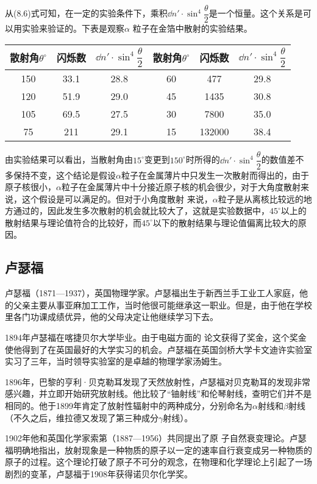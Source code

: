 从(8.6)式可知，在一定的实验条件下，乘积$\dd n'\cdot \sin^4\dfrac{\theta}{2}$是一个恒量。这个关系是可以用实验来验证的。下表是观察$\alpha$
粒子在金箔中散射的实验结果。

\begin{center}
\begin{tabular}{ccc||ccc}
    \hline
    散射角$\theta^{\circ}$  & 闪烁数  &  $\dd n'\cdot \sin^4\dfrac{\theta}{2}$ & 散射角$\theta^{\circ}$  & 闪烁数  &  $\dd n'\cdot \sin^4\dfrac{\theta}{2}$\\
    \hline
    150&    33.1&    28.8&    60&    477&    29.8\\
    120&51.9&29.0&45&1435&30.8\\
    105&69.5&27.5&30&7800&35.0\\
75&211&29.1&15&132000&38.4\\
\hline
\end{tabular}
\end{center}


由实验结果可以看出，当散射角由$15^{\circ}$变更到$150^{\circ}$时所得的$\dd n'\cdot \sin^4\dfrac{\theta}{2}$的数值差不多保持不变，这个结论是假设$\alpha$粒子在金属薄片中只发生一次散射而得出的，由于原子核很小，$\alpha$粒子在金属薄片中十分接近原子核的机会很少，对于大角度散射来说，这个假设是可以满足的。但对于小角度散射
来说，$\alpha$粒子是从离核比较远的地方通过的，因此发生多次散射的机会就比较大了，这就是实验数据中，$45^{\circ}$以上的散射结果与理论值符合的比较好，而$45^{\circ}$以下的散射结果与理论值偏离比较大的原因。


\subsection{卢瑟福}
卢瑟福（1871—1937），英国物理学家。卢瑟福出生于新西兰手工业工人家庭，他的父亲主要从事亚麻加工工作，当时他很可能继承这一职业。但是，由于他在学校里各门功课成绩优异，他的父母决定让他继续学习下去。

1894年卢瑟福在喀捷贝尔大学毕业。由于电磁方面的
论文获得了奖金，这个奖金使他得到了在英国最好的大学实习的机会。卢瑟福在英国剑桥大学卡文迪许实验室实习了三年，当时领导实验室的是卓越的物理学家汤姆生。

1896年，巴黎的亨利·贝克勒耳发现了天然放射性，卢瑟福对贝克勒耳的发现非常感兴趣，并立即开始研究放射线。他比较了“铀射线”和伦琴射线，查明它们并不是相同的。他于1899年肯定了放射性辐射中的两种成分，分别命名为$\alpha$射线和$\beta$射线（不久之后，维拉德又发现了第三种成分$\gamma$射线）。

1902年他和英国化学家索第（1887—1956）共同提出了原
子自然衰变理论。卢瑟福明确地指出，放射现象是一种物质的原子以一定的速率自行衰变成另一种物质的原子的过程。这个理论打破了原子不可分的观念，在物理和化学理论上引起了一场剧烈的变革，卢瑟福于1908年获得诺贝尔化学奖。

